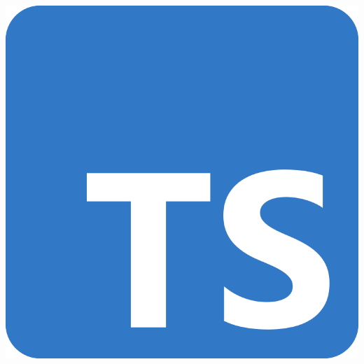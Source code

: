 \begin{frame}
\begin{minipage}{0.49\textwidth}
\begin{center}
\includegraphics[height=0.175\textheight]{typescript}\\[12pt]
\end{center}
\end{minipage}
\end{frame}

